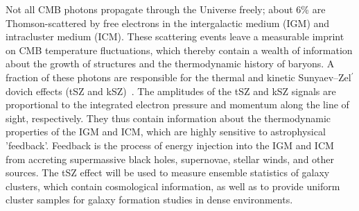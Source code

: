 \documentclass[PICOReport.tex]{subfiles}
\begin{document}
\vspace{0.1in}
 \hspace{0.1in} \label{sz}
Not all CMB photons propagate through the Universe freely; about 6\% are Thomson-scattered by free electrons in the intergalactic medium (IGM) and intracluster medium (ICM). These scattering events leave a measurable imprint on CMB temperature fluctuations, which thereby contain a wealth of information about the growth of structures and the thermodynamic history of baryons. A fraction of these photons are responsible for the thermal and kinetic Sunyaev--Zel$^{\prime}$dovich effects (tSZ and kSZ)~\citep{zeldovich69,SZ1972}. 
The amplitudes of the tSZ and kSZ signals are proportional to the integrated electron pressure and momentum along the line of sight, respectively.  They thus contain information about the thermodynamic properties of the IGM and ICM, which are highly sensitive to astrophysical 'feedback'. Feedback is the process of energy injection into the IGM and ICM from accreting supermassive black holes, supernovae, stellar winds, and other sources.
The tSZ effect will be used to measure ensemble statistics of galaxy clusters, which contain cosmological information, as well as to provide uniform cluster samples for galaxy formation studies in dense environments. 
\end{document}

